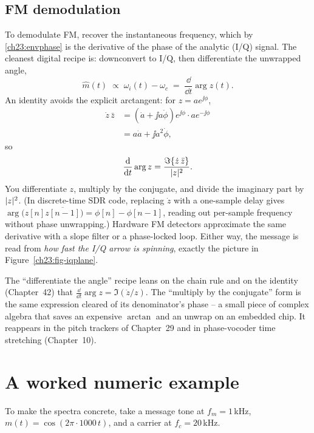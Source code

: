 \subsection{FM demodulation}
\label{ch23:fmdemod}

To demodulate FM, recover the instantaneous frequency, which by \eqref{ch23:envphase} is
the derivative of the phase of the analytic (I/Q) signal. The cleanest digital recipe is:
downconvert to I/Q, then differentiate the unwrapped angle,
\begin{equation}
\label{ch23:fmdemod-eq}
\hat m(t) \;\propto\; \omega_i(t)-\omega_c \;=\; \frac{\dd}{\dd t}\arg z(t).
\end{equation}
An identity avoids the explicit arctangent: for $z = a e^{\jj\phi}$,
\begin{align*}
\dot z\,\bar z &= (\dot a + \jj a\dot\phi)e^{\jj\phi}\cdot a e^{-\jj\phi} \\
&= a\dot a + \jj a^2\dot\phi,
\end{align*}
so 
\[
\frac{\mathrm{d}}{\mathrm{d} t}\arg z = \frac{\Im\{\dot z\,\bar z\}}{\lvert z\rvert^2}.
\]
You differentiate $z$,
multiply by the conjugate, and divide the imaginary part by $\lvert z\rvert^2$. (In discrete-time SDR code, replacing $\dot z$ with a one-sample delay gives $\arg\bigl(z[n]\overline{z[n-1]}\bigr) = \phi[n]-\phi[n-1]$, reading out per-sample frequency without phase unwrapping.) Hardware FM detectors
approximate the same derivative with a slope filter or a phase-locked loop. Either way,
the message is read from \emph{how fast the I/Q arrow is spinning}, exactly the picture in
Figure~\ref{ch23:fig-iqplane}.

\begin{connectionbox}
The ``differentiate the angle'' recipe leans on the chain rule and on the identity (Chapter~42)
that $\frac{\dd}{\dd t}\arg z = \Im(\dot z/z)$. The ``multiply by the
conjugate'' form is the same expression cleared of its denominator's phase -- a small
piece of complex algebra that saves an expensive $\arctan$ and an unwrap on an embedded
chip. It reappears in the pitch trackers of Chapter~29 and in phase-vocoder time stretching (Chapter~10).
\end{connectionbox}

\section{A worked numeric example}
\label{ch23:worked}

To make the spectra concrete, take a message tone at
$f_m = 1\,$kHz, $m(t)=\cos(2\pi\cdot 1000\,t)$, and a carrier at $f_c = 20\,$kHz.

